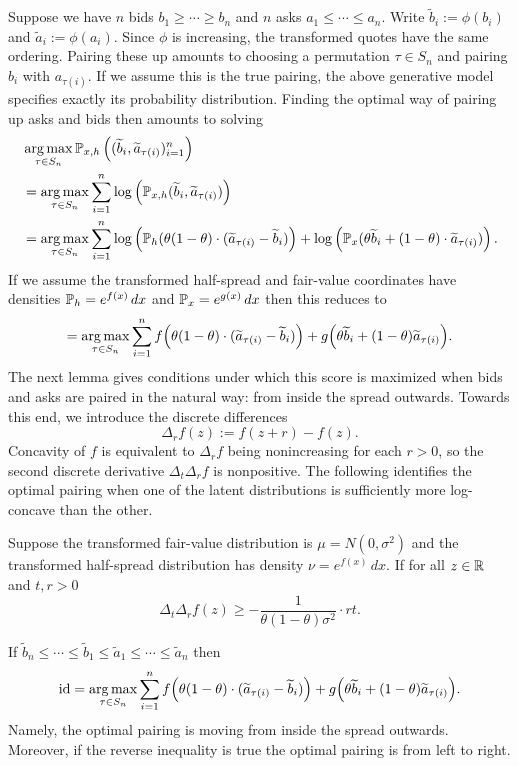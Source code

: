 Suppose we have $n$ bids $b_1 \geq \cdots \geq b_n$ and $n$ asks $a_1 \leq \cdots \leq a_n$. Write $\widetilde b_i:=\phi(b_i)$ and $\widetilde a_i:=\phi(a_i)$. Since $\phi$ is increasing, the transformed quotes have the same ordering. Pairing these up amounts to choosing a permutation $\tau \in S_n$ and pairing $b_i$ with $a_{\tau(i)}$. If we assume this is the true pairing, the above generative model specifies exactly its probability distribution. Finding the optimal way of pairing up asks and bids then amounts to solving
%
\begin{align*}
    & \argmax_{\tau \in S_n} \P_{x,h}\left((\widetilde b_i, \widetilde a_{\tau(i)})_{i=1}^n\right) \\
    & = \argmax_{\tau \in S_n} \sum_{i=1}^n \log\left(\P_{x,h}(\widetilde b_i, \widetilde a_{\tau(i)})\right) \\
    & = \argmax_{\tau \in S_n} \sum_{i=1}^n \log\left(\P_h(\theta (1-\theta) \cdot (\widetilde a_{\tau(i)} - \widetilde b_i)\right) + \log\left( \P_x(\theta \widetilde b_i + (1-\theta) \cdot \widetilde a_{\tau(i)})\right).
\end{align*}
%
\noindent If we assume the transformed half-spread and fair-value coordinates have densities $\P_h=e^{f(x)}\,dx$ and $\P_x=e^{g(x)}\,dx$ then this reduces to
%
\[= \argmax_{\tau \in S_n} \sum_{i=1}^n f\Big(\theta(1-\theta) \cdot (\widetilde a_{\tau(i)} - \widetilde b_i) \Big ) + g\Big(\theta \widetilde b_i + (1-\theta) \widetilde a_{\tau(i)}\Big). \]
%
\noindent The next lemma gives conditions under which this score is maximized
when bids and asks are paired in the natural way: from inside the spread
outwards. Towards this end, we introduce the discrete differences
%
\[\Delta_r f(z) := f(z + r) - f(z).\]
%
\noindent Concavity of $f$ is equivalent to $\Delta_r f$ being nonincreasing for
each $r > 0$, so the second discrete derivative $\Delta_t \Delta_r f$ is
nonpositive. The following identifies the optimal pairing when one of the latent
distributions is sufficiently more log-concave than the other.

\begin{lemma}
\label{lem:optimal_pairing_bids_and_asks_gaussian}
    Suppose the transformed fair-value distribution is $\mu=N(0,\sigma^2)$ and the transformed half-spread distribution has density $\nu=e^{f(x)}\,dx$. If for all $z \in \R$
    and $t,r > 0$
    \begin{equation}
         \Delta_t \Delta_r f(z) \geq - \frac{1}{\theta(1-\theta)\sigma^2} \cdot rt.
         \label{eqn:gaussian_concavity_condition}
    \end{equation}

    \noindent If $\widetilde b_n \leq \cdots \leq \widetilde b_1 \leq \widetilde a_1 \leq \cdots \leq \widetilde a_n$ then
    \[\mathrm{id} = \argmax_{\tau \in S_n} \sum_{i=1}^n f\Big(\theta(1-\theta) \cdot (\widetilde a_{\tau(i)} - \widetilde b_i) \Big ) + g\Big(\theta \widetilde b_i + (1-\theta) \widetilde a_{\tau(i)}\Big). \]
    \noindent Namely, the optimal pairing is moving from inside the spread outwards.
     Moreover, if the reverse inequality is true the optimal pairing is from left to
     right.

\end{lemma}

